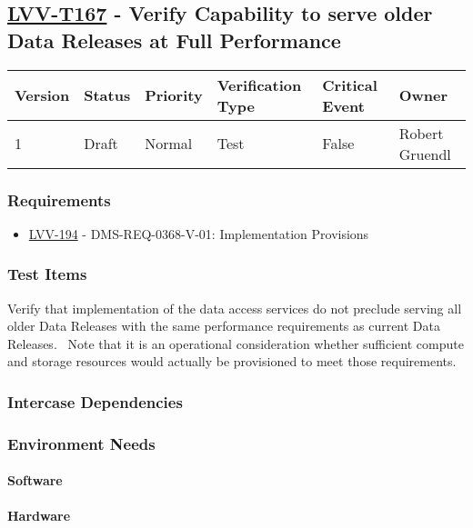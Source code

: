 \subsection{\href{https://jira.lsstcorp.org/secure/Tests.jspa\#/testCase/LVV-T167}{LVV-T167}
    - Verify Capability to serve older Data Releases at Full Performance}\label{lvv-t167}

\begin{longtable}[]{llllll}
\toprule
Version & Status & Priority & Verification Type & Critical Event & Owner
\\\midrule
1 & Draft & Normal &
Test & False & Robert Gruendl
\\\bottomrule
\end{longtable}

\subsubsection{Requirements}
\begin{itemize}
\item \href{https://jira.lsstcorp.org/browse/LVV-194}{LVV-194} - DMS-REQ-0368-V-01: Implementation Provisions
\end{itemize}

\subsubsection{Test Items}
Verify that implementation of the data access services do not preclude
serving all older Data Releases with the same performance requirements
as current Data Releases. ~Note that it is an operational consideration
whether sufficient compute and storage resources would actually be
provisioned to meet those requirements.



\subsubsection{Intercase Dependencies}

\subsubsection{Environment Needs}

\paragraph{Software}

\paragraph{Hardware}

